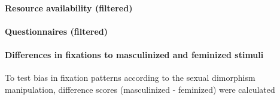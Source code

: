 \documentclass[
  bookmarksnumbered]{article}
\newenvironment{Shaded}{\begin{snugshade}}{\end{snugshade}}
\newcommand{\AttributeTok}[1]{\textcolor[rgb]{0.80,0.80,0.80}{#1}}
\newcommand{\FunctionTok}[1]{\textcolor[rgb]{0.94,0.94,0.56}{#1}}
\newcommand{\NormalTok}[1]{\textcolor[rgb]{0.80,0.80,0.80}{#1}}
\newcommand{\OtherTok}[1]{\textcolor[rgb]{0.94,0.94,0.56}{#1}}
\newcommand{\SpecialCharTok}[1]{\textcolor[rgb]{0.86,0.64,0.64}{#1}}
\newcommand{\StringTok}[1]{\textcolor[rgb]{0.80,0.58,0.58}{#1}}
\begin{document}
\paragraph{Resource availability (filtered)}\label{resource-availability-filtered}

\begin{Shaded}
\end{Shaded}

\paragraph{Questionnaires (filtered)}\label{questionnaires-filtered}

\begin{Shaded}
\end{Shaded}

\paragraph{Differences in fixations to masculinized and feminized stimuli}\label{differences-in-fixations-to-masculinized-and-feminized-stimuli}

To test bias in fixation patterns according to the sexual dimorphism manipulation, difference scores (masculinized - feminized) were calculated
\end{document}
